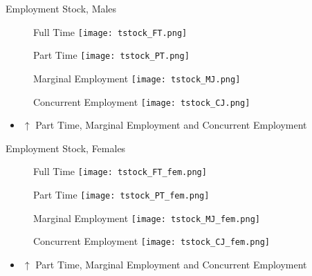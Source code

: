 \documentclass[hyperref={bookmarks=false}]{beamer}
\let\oldcite=\cite
\renewcommand{\cite}[1]{\textcolor[rgb]{.0,.2,.7}{\oldcite{#1}}}
\begin{document}
\begin{appendix}
\begin{frame}{Employment Stock, Males}
\begin{figure}[!t]
\centering
\begin{minipage}[b]{0.4\textwidth}{Full Time}
\centering
\texttt{[image: tstock\_FT.png]}
\end{minipage}
\begin{minipage}[b]{0.4\textwidth}{Part Time}
\centering
\texttt{[image: tstock\_PT.png]}
\end{minipage}
\begin{minipage}[b]{0.4\textwidth}{Marginal Employment}
\centering
\texttt{[image: tstock\_MJ.png]}
\end{minipage}
\begin{minipage}[b]{0.4\textwidth}{Concurrent Employment}
\centering
\texttt{[image: tstock\_CJ.png]}
\end{minipage}
\end{figure}
\begin{itemize}
\setlength{\itemsep}{0.7 cm}
\item $\uparrow$ Part Time, Marginal Employment and Concurrent Employment \cite{CarriTuRo15} 
\end{itemize}
\end{frame}

\begin{frame}{Employment Stock, Females}
\begin{figure}[!t]
\centering
\begin{minipage}[b]{0.4\textwidth}{Full Time}
\centering
\texttt{[image: tstock\_FT\_fem.png]}
\end{minipage}
\begin{minipage}[b]{0.4\textwidth}{Part Time}
\centering
\texttt{[image: tstock\_PT\_fem.png]}
\end{minipage}
\begin{minipage}[b]{0.4\textwidth}{Marginal Employment}
\centering
\texttt{[image: tstock\_MJ\_fem.png]}
\end{minipage}
\begin{minipage}[b]{0.4\textwidth}{Concurrent Employment}
\centering
\texttt{[image: tstock\_CJ\_fem.png]}
\end{minipage}
\end{figure}
\begin{itemize}
\setlength{\itemsep}{0.7 cm}
\item $\uparrow$ Part Time, Marginal Employment and Concurrent Employment \cite{CarriTuRo15} 
\end{itemize}
\end{frame}


\end{appendix}
\end{document}
